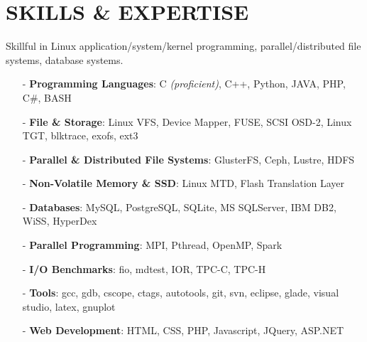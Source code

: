 \section{SKILLS \& EXPERTISE}
Skillful in Linux application/system/kernel programming, parallel/distributed file systems, database systems.
\begin{itemize}[leftmargin=*]
\setlength\itemsep{-0.02in}
\item[-] {\bf Programming Languages}: C {\footnotesize \it (proficient)}, C++,
         Python, JAVA, PHP, C\#, BASH
\item[-] {\bf File \& Storage}: Linux VFS, Device Mapper, FUSE, SCSI OSD-2, Linux TGT, blktrace, exofs, ext3
\item[-] {\bf Parallel \& Distributed File Systems}: GlusterFS, Ceph, Lustre, HDFS
\item[-] {\bf Non-Volatile Memory \& SSD}: Linux MTD, Flash Translation Layer
\item[-] {\bf Databases}: MySQL, PostgreSQL, SQLite, MS SQLServer, IBM DB2, WiSS, HyperDex
\item[-] {\bf Parallel Programming}: MPI, Pthread, OpenMP, Spark
\item[-] {\bf I/O Benchmarks}: fio, mdtest, IOR, TPC-C, TPC-H
\item[-] {\bf Tools}: gcc, gdb, cscope, ctags, autotools, git, svn, eclipse, glade, visual studio, latex, gnuplot
\item[-] {\bf Web Development}: HTML, CSS, PHP, Javascript, JQuery, ASP.NET
\end{itemize}

